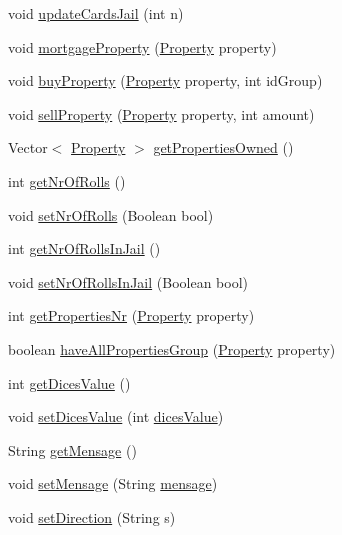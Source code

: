 \begin{DoxyCompactItemize}
void \hyperlink{class_monopoly_1_1_logic_1_1_player_abdc35813a10ca9287fcae445b608cfe8}{update\+Cards\+Jail} (int n)
\item 
void \hyperlink{class_monopoly_1_1_logic_1_1_player_a879e52a0d8181c287ad92c4b8a28a9b6}{mortgage\+Property} (\hyperlink{class_monopoly_1_1_logic_1_1_property}{Property} property)
\item 
void \hyperlink{class_monopoly_1_1_logic_1_1_player_ad996dcb61a56f2d654360cf20c6a6706}{buy\+Property} (\hyperlink{class_monopoly_1_1_logic_1_1_property}{Property} property, int id\+Group)
\item 
void \hyperlink{class_monopoly_1_1_logic_1_1_player_a038287240a4474f3647f474f04d8b717}{sell\+Property} (\hyperlink{class_monopoly_1_1_logic_1_1_property}{Property} property, int amount)
\item 
Vector$<$ \hyperlink{class_monopoly_1_1_logic_1_1_property}{Property} $>$ \hyperlink{class_monopoly_1_1_logic_1_1_player_a6ba450aac241567eb194142cecb1922a}{get\+Properties\+Owned} ()
\item 
int \hyperlink{class_monopoly_1_1_logic_1_1_player_a4931f562adff2bb9a90e9870a687ab92}{get\+Nr\+Of\+Rolls} ()
\item 
void \hyperlink{class_monopoly_1_1_logic_1_1_player_ab56147181edcec6bbbd1c4dff8c630b7}{set\+Nr\+Of\+Rolls} (Boolean bool)
\item 
int \hyperlink{class_monopoly_1_1_logic_1_1_player_a508585931f8d357c2535552a5c182474}{get\+Nr\+Of\+Rolls\+In\+Jail} ()
\item 
void \hyperlink{class_monopoly_1_1_logic_1_1_player_adb60a038f205641fae1b9c1cc375460f}{set\+Nr\+Of\+Rolls\+In\+Jail} (Boolean bool)
\item 
int \hyperlink{class_monopoly_1_1_logic_1_1_player_af41bd8293d5b9f239b08589b1016660c}{get\+Properties\+Nr} (\hyperlink{class_monopoly_1_1_logic_1_1_property}{Property} property)
\item 
boolean \hyperlink{class_monopoly_1_1_logic_1_1_player_a08631c9db2cdc0225393ce5699bbf44e}{have\+All\+Properties\+Group} (\hyperlink{class_monopoly_1_1_logic_1_1_property}{Property} property)
\item 
int \hyperlink{class_monopoly_1_1_logic_1_1_player_a469824453601f9ea9fafe9c705b1f86b}{get\+Dices\+Value} ()
\item 
void \hyperlink{class_monopoly_1_1_logic_1_1_player_a86e4fe7be709b46c21a8c9232c29e435}{set\+Dices\+Value} (int \hyperlink{class_monopoly_1_1_logic_1_1_player_a73973f9d5106195b500c2c99c7e72abd}{dices\+Value})
\item 
String \hyperlink{class_monopoly_1_1_logic_1_1_player_aba3ec4dc3998f97a8766d00e649e2410}{get\+Mensage} ()
\item 
void \hyperlink{class_monopoly_1_1_logic_1_1_player_a5aa84b8f9771bb39819df1002488df5c}{set\+Mensage} (String \hyperlink{class_monopoly_1_1_logic_1_1_player_ae1e9a893f8b815bc34a00c36492a8722}{mensage})
\item 
void \hyperlink{class_monopoly_1_1_logic_1_1_player_a31105cb31489a5f0ed35d6a99d108451}{set\+Direction} (String s)
\end{DoxyCompactItemize}
